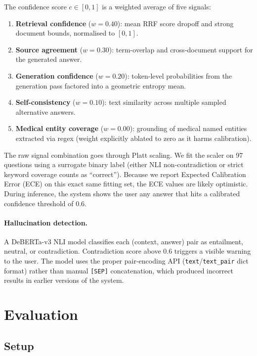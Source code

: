 \documentclass[conference,a4paper]{IEEEtran}
\begin{document}
The confidence score $c \in [0,1]$ is a weighted average of five signals:

\begin{enumerate}[noitemsep,topsep=2pt]
  \item \textbf{Retrieval confidence} ($w=0.40$): mean RRF score dropoff and strong document bounds, normalised to $[0,1]$.
  \item \textbf{Source agreement} ($w=0.30$): term-overlap and cross-document support for the generated answer.
  \item \textbf{Generation confidence} ($w=0.20$): token-level probabilities from the generation pass factored into a geometric entropy mean.
  \item \textbf{Self-consistency} ($w=0.10$): text similarity across multiple sampled alternative answers.
  \item \textbf{Medical entity coverage} ($w=0.00$): grounding of medical named entities extracted via regex (weight explicitly ablated to zero as it harms calibration).
\end{enumerate}

The raw signal combination goes through Platt scaling. We fit the scaler on 97 questions using a surrogate binary label (either NLI non-contradiction or strict keyword coverage counts as ``correct''). Because we report Expected Calibration Error (ECE) on this exact same fitting set, the ECE values are likely optimistic. During inference, the system shows the user any answer that hits a calibrated confidence threshold of 0.6.

\paragraph{Hallucination detection.}
A DeBERTa-v3 NLI model \cite{he2021deberta} classifies each
(context, answer) pair as entailment, neutral, or contradiction.
Contradiction score above 0.6 triggers a visible warning to the user.
The model uses the proper pair-encoding API
(\texttt{text}/\texttt{text\_pair} dict format) rather than manual
\texttt{[SEP]} concatenation, which produced incorrect results in
earlier versions of the system.

\section{Evaluation}
\label{sec:eval}

\subsection{Setup}
\end{document}

